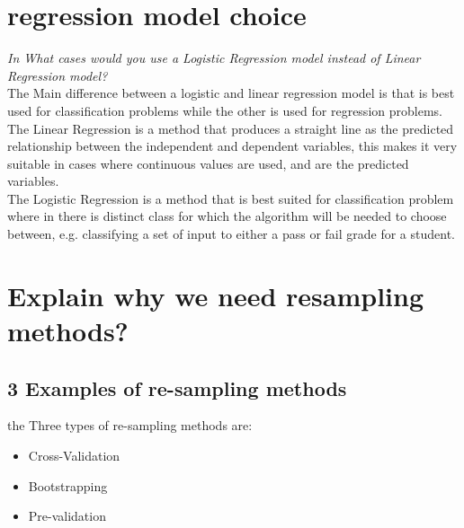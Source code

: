\documentclass[a4paper,12pt]{report}
\begin{document}
\section{regression model choice}
\emph{In What cases would you use a Logistic Regression model instead of Linear Regression model?}\vspace{0.5cm}\\
The Main difference between a logistic and linear regression model is that is best used for classification problems while the other is used for regression problems.\\ The Linear Regression is a method that produces a straight line as the predicted relationship between the independent and dependent variables, this makes it very suitable in cases where continuous values are used, and are the predicted variables. \\
The Logistic Regression is a method that is best suited for classification problem where in there is distinct class for which the algorithm will be needed to choose between, e.g. classifying a set of input to either a pass or fail grade for a student.

\section{Explain why we need resampling methods?}
\subsection{3 Examples of re-sampling methods}
the Three types of re-sampling methods are:
\begin{itemize}
	\item Cross-Validation 
	\item Bootstrapping
	\item Pre-validation
\end{itemize}
\end{document}
